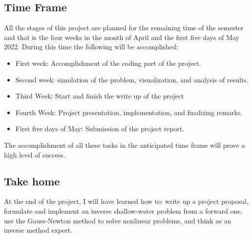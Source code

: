 \documentclass[11pt,a4paper]{article}
\begin{document}
	\subsection*{Time Frame}
	All the stages of this project are planned for the remaining time of the semester and that is the four weeks in the month of April and the first five days of May 2022. During this time the following will be accomplished;
	\begin{itemize}
		\item First week: Accomplishment of the coding part of the project.
		\item Second week: simulation of the problem, visualization, and analysis of results.
		\item Third Week: Start and finish the write  up of the project 
		\item Fourth Week: Project presentation, implementation, and finalizing remarks.
		\item First five days of May: Submission of the project report.
	\end{itemize}
	The accomplishment of all these tasks in the anticipated time frame will prove a high level of success.
	\subsection*{Take home}
	At the end of the project, I will have learned how to: write up a project proposal, formulate and implement an inverse shallow-water problem from a forward one, use the Gauss-Newton method to solve nonlinear problems, and think as an inverse method expert. 
	
	
	
	
	
\end{document}
